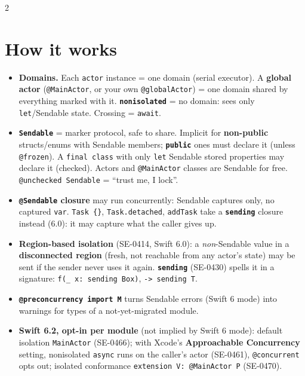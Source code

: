 \documentclass[8pt]{extarticle}
\begin{document}


\begin{multicols}{2}
\raggedright

\section{How it works}
\begin{itemize}
  \item \textbf{Domains.} Each \texttt{actor} instance = one domain (serial
        executor). A \textbf{global actor} (\texttt{@MainActor}, or
        your own \texttt{@globalActor}) = one
        domain shared by everything marked with it. \textbf{\texttt{nonisolated}}
        = no domain: sees only \texttt{let}/Sendable state. Crossing = \texttt{await}.
  \item \textbf{\texttt{Sendable}} = marker protocol, safe to share. Implicit for
        \textbf{non-public} structs/enums with Sendable members;
        \textbf{\texttt{public}} ones must declare it (unless \texttt{@frozen}). A \texttt{final class}
        with only \texttt{let} Sendable stored properties may declare it (checked).
        Actors and \texttt{@MainActor} classes are Sendable for free.
        \texttt{@unchecked Sendable} = ``trust me, I lock''.
  \item \textbf{\texttt{@Sendable} closure} may run concurrently: Sendable
        captures only, no captured \texttt{var}. \texttt{Task \{\}},
        \texttt{Task.detached}, \texttt{addTask} take a \textbf{\texttt{sending}} closure instead (6.0): it may capture what the caller gives up.
  \item \textbf{Region-based isolation} (SE-0414, Swift 6.0): a
        \emph{non}-Sendable value in a \textbf{disconnected region} (fresh, not
        reachable from any actor's state) may be sent if the sender never uses it
        again. \textbf{\texttt{sending}} (SE-0430) spells it in a signature:
        \texttt{f(\_ x: sending Box)}, \texttt{-> sending T}.
  \item \textbf{\texttt{@preconcurrency import M}} turns Sendable errors (Swift 6 mode) into warnings for
        types of a not-yet-migrated module.
  \item \textbf{Swift 6.2, opt-in per module} (not implied by Swift 6 mode):
        default isolation \texttt{MainActor} (SE-0466); with Xcode's \textbf{Approachable Concurrency} setting, nonisolated
        \texttt{async} runs on the caller's actor (SE-0461), \texttt{@concurrent}
        opts out; isolated conformance \texttt{extension V: @MainActor P} (SE-0470).
\end{itemize}


\end{multicols}
\end{document}
